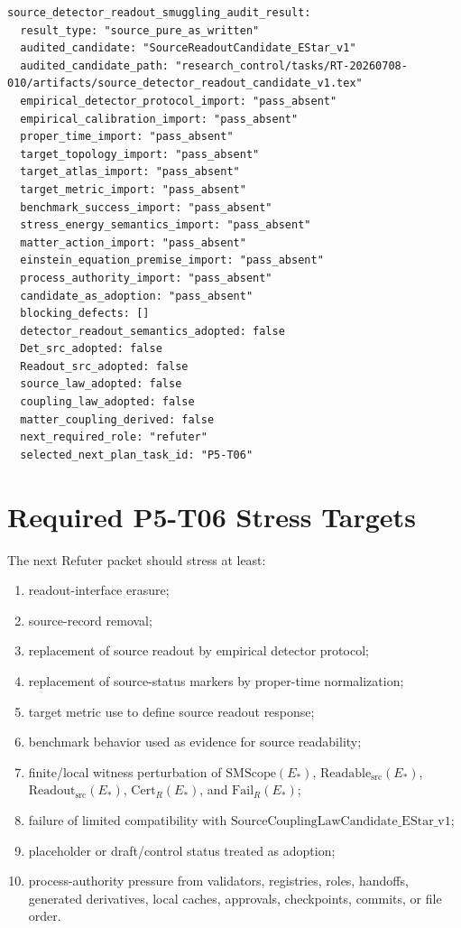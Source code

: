 \documentclass[11pt]{article}
\newcommand{\EStar}{E_{\ast}}
\newcommand{\SMScope}{\mathrm{SMScope}}
\newcommand{\ReadableSrc}{\mathrm{Readable}_{\mathrm{src}}}
\newcommand{\ReadoutSrc}{\mathrm{Readout}_{\mathrm{src}}}
\newcommand{\CertR}{\mathrm{Cert}_{R}}
\newcommand{\FailR}{\mathrm{Fail}_{R}}
\begin{document}
\begin{verbatim}
source_detector_readout_smuggling_audit_result:
  result_type: "source_pure_as_written"
  audited_candidate: "SourceReadoutCandidate_EStar_v1"
  audited_candidate_path: "research_control/tasks/RT-20260708-010/artifacts/source_detector_readout_candidate_v1.tex"
  empirical_detector_protocol_import: "pass_absent"
  empirical_calibration_import: "pass_absent"
  proper_time_import: "pass_absent"
  target_topology_import: "pass_absent"
  target_atlas_import: "pass_absent"
  target_metric_import: "pass_absent"
  benchmark_success_import: "pass_absent"
  stress_energy_semantics_import: "pass_absent"
  matter_action_import: "pass_absent"
  einstein_equation_premise_import: "pass_absent"
  process_authority_import: "pass_absent"
  candidate_as_adoption: "pass_absent"
  blocking_defects: []
  detector_readout_semantics_adopted: false
  Det_src_adopted: false
  Readout_src_adopted: false
  source_law_adopted: false
  coupling_law_adopted: false
  matter_coupling_derived: false
  next_required_role: "refuter"
  selected_next_plan_task_id: "P5-T06"
\end{verbatim}

\section{Required P5-T06 Stress Targets}

The next Refuter packet should stress at least:

\begin{enumerate}[label=(\alph*)]
  \item readout-interface erasure;
  \item source-record removal;
  \item replacement of source readout by empirical detector protocol;
  \item replacement of source-status markers by proper-time normalization;
  \item target metric use to define source readout response;
  \item benchmark behavior used as evidence for source readability;
  \item finite/local witness perturbation of \(\SMScope(\EStar)\),
        \(\ReadableSrc(\EStar)\), \(\ReadoutSrc(\EStar)\), \(\CertR(\EStar)\),
        and \(\FailR(\EStar)\);
  \item failure of limited compatibility with
        \(\mathrm{SourceCouplingLawCandidate\_EStar\_v1}\);
  \item placeholder or draft/control status treated as adoption;
  \item process-authority pressure from validators, registries, roles,
        handoffs, generated derivatives, local caches, approvals,
        checkpoints, commits, or file order.
\end{enumerate}
\end{document}
